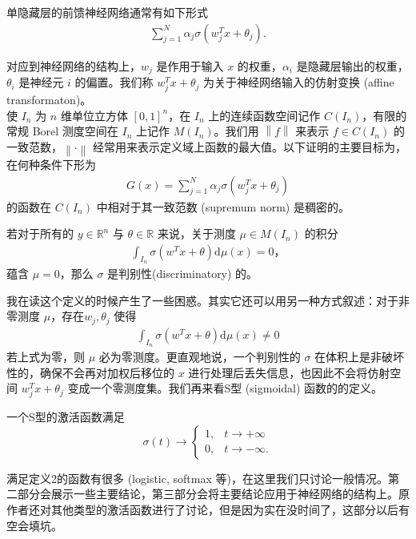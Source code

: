 \documentclass[12pt]{article}
\begin{document}
单隐藏层的前馈神经网络通常有如下形式
\begin{align*}
    \sum_{j=1}^N \alpha_j \sigma (w_j^T x +\theta_j).
\end{align*}

对应到神经网络的结构上，$w_j$ 是作用于输入 $x$ 的权重，$\alpha_i$ 是隐藏层输出的权重，$\theta_i$ 是神经元 $i$ 的偏置。我们称 $w_j^Tx+\theta_j$ 为关于神经网络输入的仿射变换 (affine transformaton)。\\

使 $I_n$ 为 $n$ 维单位立方体 $[0,1]^n$，在 $I_n$ 上的连续函数空间记作 $C(I_n)$，有限的常规 Borel 测度空间在 $I_n$ 上记作 $M(I_n)$。我们用 $\left\lVert f\right\rVert $ 来表示 $f\in C(I_n)$ 的一致范数，$\left\lVert \cdot\right\rVert $ 经常用来表示定义域上函数的最大值。以下证明的主要目标为，在何种条件下形为
\begin{align*}
    G(x)= \sum_{j=1}^N \alpha_j \sigma (w_j^T x +\theta_j)
\end{align*}
的函数在 $C(I_n)$ 中相对于其一致范数 (supremum norm) 是稠密的。

\begin{mydefinition}
    若对于所有的 $y\in \mathbb{R}^n$ 与 $\theta\in \mathbb{R}$ 来说，关于测度 $\mu\in M(I_n)$ 的积分
    \begin{align*}
        \int_{I_n} \sigma(w^Tx+\theta)\mathrm{d}\mu(x)=0，
    \end{align*}
    蕴含 $\mu=0$，那么 $\sigma$ 是判别性(discriminatory) 的。
\end{mydefinition}
我在读这个定义的时候产生了一些困惑。其实它还可以用另一种方式叙述：对于非零测度 $\mu$，存在$w_j, \theta_j$ 使得
\begin{align*}
\int_{I_n}\sigma(w^Tx+\theta)\mathrm{d}\mu(x)\neq 0
\end{align*}
若上式为零，则 $\mu$ 必为零测度。更直观地说，一个判别性的 $\sigma$ 在体积上是非破坏性的，确保不会再对加权后移位的 $x$ 进行处理后丢失信息，也因此不会将仿射空间 $w_j^Tx+\theta_j$ 变成一个零测度集。我们再来看S型 (sigmoidal) 函数的的定义。

\begin{mydefinition}
    一个S型的激活函数满足
    $$\sigma(t) \to 
    \begin{cases} 
    1, & t \to +\infty \\
    0, &  t \to -\infty.
    \end{cases}$$
\end{mydefinition}
满足定义2的函数有很多 (logistic, softmax 等)，在这里我们只讨论一般情况。第二部分会展示一些主要结论，第三部分会将主要结论应用于神经网络的结构上。原作者还对其他类型的激活函数进行了讨论，但是因为实在没时间了，这部分以后有空会填坑。
\end{document}
